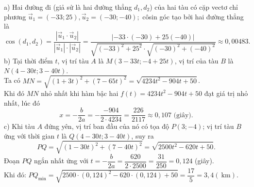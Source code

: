 \begin{loigiaibt}{4}
 a) Hai đường đi (giả sử là hai đường thẳng $d_1, d_2$) của hai tàu có cặp vectơ chỉ phương $\vec {u}_1=(-33 ; 25), \vec {u}_2=(-30 ;-40) ;$ côsin góc tạo bởi hai đường thẳng là $$\cos \left (d_1, d_2\right )=\dfrac {\left |\vec {u}_1 \cdot \vec {u}_2\right |}{\left |\vec {u}_1\right | \cdot \left |\vec {u}_2\right |}=\dfrac {|-33 \cdot (-30)+25(-40)|}{\sqrt {(-33)^2+25^2} \cdot \sqrt {(-30)^2+(-40)^2}} \approx 0,00483.$$ b) Tại thời điểm $t$, vị trí tàu $A$ là $M(3-33 t ;-4+25 t)$, vị trí của tàu $B$ là $N(4-30 t ; 3-40 t)$.\\ Ta có $M N=\sqrt {(1+3 t)^2+(7-65 t)^2}=\sqrt {4234 t^2-904 t+50}$.\\ Khi đó $M N$ nhỏ nhất khi hàm bậc hai $f(t)=4234 t^2-904 t+50$ đạt giá trị nhỏ nhất, lúc đó $$x=-\dfrac {b}{2 a}=-\dfrac {-904}{2\cdot 4234}=\dfrac {226}{2117} \approx 0,107 \text { (giây).}$$ c) Khi tàu $A$ đứng yên, vị trí ban đầu của nó có tọa độ $P(3 ;-4)$; vị trí tàu $B$ ứng với thời gian $t$ là $Q(4-30 t ; 3-40 t)$, suy ra $$ P Q=\sqrt {(1-30 t)^2+(7-40 t)^2}=\sqrt {2500 t^2-620 t+50} . $$ Đoạn $P Q$ ngắn nhất ứng với $t=-\dfrac {b}{2 a}=\dfrac {620}{2 \cdot 2500}=\dfrac {31}{250}=0,124$ (giây).\\ Khi đó: $P Q_{\min }=\sqrt {2500 \cdot (0,124)^2-620 \cdot (0,124)+50}=\dfrac {17}{5}=3,4(\mathrm {~km})$. 
\end{loigiaibt}
